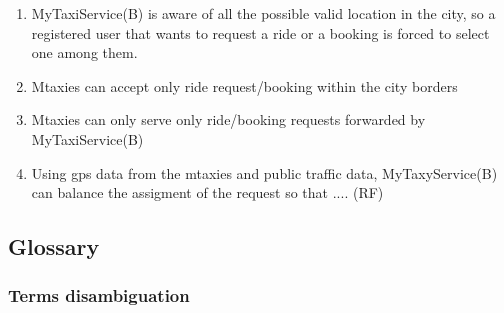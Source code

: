 \documentclass[11pt]{article} %
\begin{document}
\begin{enumerate}
    \item MyTaxiService(B) is aware of all the possible valid location in the city, so a registered user that wants to request a ride or a booking is forced to select one among them.

    \item Mtaxies can accept only ride request/booking within the city borders

    \item Mtaxies can only serve only ride/booking requests forwarded by MyTaxiService(B)

    \item Using gps data from the mtaxies and public traffic data, MyTaxyService(B) can balance the assigment
    of the request so that  .... (RF)
    \end{enumerate}
      
    \subsection{Glossary}

        \subsubsection{Terms disambiguation}
        
\end{document}
